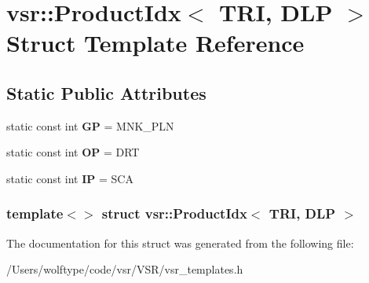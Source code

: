 \hypertarget{structvsr_1_1_product_idx_3_01_t_r_i_00_01_d_l_p_01_4}{\section{vsr\-:\-:Product\-Idx$<$ T\-R\-I, D\-L\-P $>$ Struct Template Reference}
\label{structvsr_1_1_product_idx_3_01_t_r_i_00_01_d_l_p_01_4}
}
\subsection*{Static Public Attributes}
\begin{DoxyCompactItemize}
\item 
\hypertarget{structvsr_1_1_product_idx_3_01_t_r_i_00_01_d_l_p_01_4_a49248a60bd257b9964a72f994e70583d}{static const int {\bfseries G\-P} = M\-N\-K\-\_\-\-P\-L\-N}\label{structvsr_1_1_product_idx_3_01_t_r_i_00_01_d_l_p_01_4_a49248a60bd257b9964a72f994e70583d}

\item 
\hypertarget{structvsr_1_1_product_idx_3_01_t_r_i_00_01_d_l_p_01_4_a6343cfae5a1d4a460978be28f7007095}{static const int {\bfseries O\-P} = D\-R\-T}\label{structvsr_1_1_product_idx_3_01_t_r_i_00_01_d_l_p_01_4_a6343cfae5a1d4a460978be28f7007095}

\item 
\hypertarget{structvsr_1_1_product_idx_3_01_t_r_i_00_01_d_l_p_01_4_aff99fb0e7a8877d2e1a5dc23450c3c86}{static const int {\bfseries I\-P} = S\-C\-A}\label{structvsr_1_1_product_idx_3_01_t_r_i_00_01_d_l_p_01_4_aff99fb0e7a8877d2e1a5dc23450c3c86}

\end{DoxyCompactItemize}
\subsubsection*{template$<$$>$ struct vsr\-::\-Product\-Idx$<$ T\-R\-I, D\-L\-P $>$}



The documentation for this struct was generated from the following file\-:\begin{DoxyCompactItemize}
\item 
/\-Users/wolftype/code/vsr/\-V\-S\-R/vsr\-\_\-templates.\-h\end{DoxyCompactItemize}
